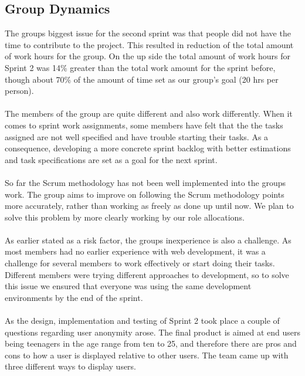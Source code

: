 \subsection{Group Dynamics}
\label{subsec:S2RetrospectiveDynamics}
The groups biggest issue for the second sprint was that people did not have the time to contribute to the project. This resulted in reduction of the total amount of work hours for the group. On the up side the total amount of work hours for Sprint 2 was 14\% greater than the total work amount for the sprint before, though about 70\% of the amount of time set as our group’s goal (20 hrs per person). 

\paragraph{} The members of the group are quite different and also work differently. When it comes to sprint work assignments, some members have felt that the the tasks assigned are not well specified and have trouble starting their tasks. As a consequence, developing a more concrete sprint backlog with better estimations and task specifications are set as a goal for the next sprint.

\paragraph{} So far the Scrum methodology has not been well implemented into the groups work. The group aims to improve on following the Scrum methodology points more accurately, rather than working as freely as done up until now. We plan to solve this problem by more clearly working by our role allocations.

\paragraph{} As earlier stated as a risk factor, the groups inexperience is also a challenge. As most members had no earlier experience with web development, it was a challenge for several members to work effectively or start doing their tasks. Different members were trying different approaches to development, so to solve this issue we ensured that everyone was using the same development environments by the end of the sprint. 

\paragraph{} As the design, implementation and testing of Sprint 2 took place a couple of questions regarding user anonymity arose. The final product is aimed at end users being teenagers in the age range from ten to 25, and therefore there are pros and cons to how a user is displayed relative to other users. The team came up with three different ways to display users. 

